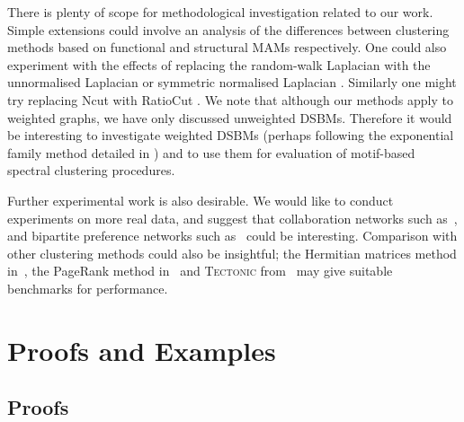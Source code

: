 \documentclass[12pt]{ociamthesis}
\theoremstyle{plain}
\theoremstyle{definition}
\theoremstyle{remark}
\begin{document}
There is plenty of scope for methodological investigation related to our work.
Simple extensions could involve an analysis of the differences between
clustering methods based on functional and structural MAMs respectively.
One could also experiment with the effects of replacing the random-walk
Laplacian with the unnormalised Laplacian or symmetric normalised Laplacian
\cite{von2007tutorial}.
Similarly one might try replacing Ncut with RatioCut \cite{hagen1992new}. We
note that although our methods apply to weighted graphs, we have only discussed
unweighted DSBMs. Therefore it would be interesting to investigate weighted
DSBMs (perhaps following the exponential family method detailed in
\cite{aicher2013adapting}) and to use them for evaluation of motif-based
spectral clustering procedures.

Further experimental work is also desirable. We would like to conduct
experiments on more real data, and suggest that collaboration networks such
as~\cite{snap:astro}, and bipartite preference networks such
as~\cite{icon:movie} could be interesting.
Comparison with other clustering methods could also be insightful; the
Hermitian matrices method in~\cite{DirectedClustImbCuts}, the PageRank method
in~\cite{yin2017local} and \textsc{Tectonic}
from~\cite{tsourakakis2017scalable} may give suitable benchmarks for
performance.

\clearpage{}

\appendix
{}

\clearpage{}
\chapter{Proofs and Examples}\label{chap:appendix_proofs}

\section{Proofs}
\end{document}
